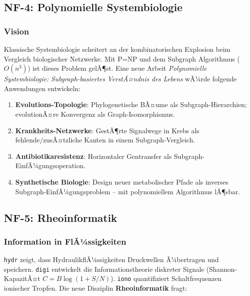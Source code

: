 ﻿\documentclass[a4paper,12pt]{scrreprt}
\theoremstyle{definition}
\begin{document}
\subsection{NF-4: Polynomielle Systembiologie}

\subsubsection{Vision}

Klassische Systembiologie scheitert an der kombinatorischen Explosion beim
Vergleich biologischer Netzwerke. Mit P=NP und dem Subgraph Algorithmus
($O(n^3)$) ist dieses Problem gelÃ¶st. Eine neue Arbeit \emph{Polynomielle
Systembiologie: Subgraph-basiertes VerstÃ¤ndnis des Lebens} wÃ¼rde folgende
Anwendungen entwickeln:

\begin{enumerate}
  \item \textbf{Evolutions-Topologie}: Phylogenetische BÃ¤ume als Subgraph-Hierarchien;
    evolutionÃ¤re Konvergenz als Graph-Isomorphismus.
  \item \textbf{Krankheits-Netzwerke}: GestÃ¶rte Signalwege in Krebs als
    fehlende/zusÃ¤tzliche Kanten in einem Subgraph-Vergleich.
  \item \textbf{Antibiotikaresistenz}: Horizontaler Gentransfer als
    Subgraph-EinfÃ¼gungsoperation.
  \item \textbf{Synthetische Biologie}: Design neuer metabolischer Pfade
    als inverses Subgraph-EinfÃ¼gungsproblem -- mit polynomiellem Algorithmus lÃ¶sbar.
\end{enumerate}

\subsection{NF-5: Rheoinformatik}

\subsubsection{Information in FlÃ¼ssigkeiten}

\texttt{hydr} zeigt, dass HydraulikflÃ¼ssigkeiten Druckwellen Ã¼bertragen
und speichern. \texttt{digi} entwickelt die Informationstheorie diskreter
Signale (Shannon-KapazitÃ¤t $C = B \log(1 + S/N)$). \texttt{iono} quantifiziert
Schaltfrequenzen ionischer Tropfen. Die neue Disziplin
\textbf{Rheoinformatik} fragt:
\end{document}
